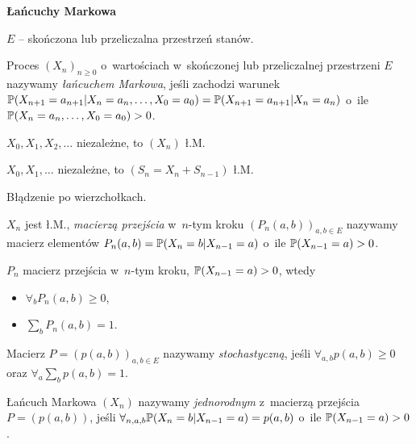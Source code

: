 	\pagebreak
	
	{\bf Łańcuchy Markowa}
	
	$E$ -- skończona lub przeliczalna przestrzeń stanów.
	
	\begin{definition}
		Proces $(X_n)_{n \geq 0}$ o~wartościach w~skończonej 
		lub przeliczalnej przestrzeni $E$ nazywamy
		\emph{łańcuchem Markowa},
		jeśli zachodzi warunek
		$\P(X_{n+1}=a_{n+1} | X_n = a_n, \ldots, X_0 = a_0)
		= \P(X_{n+1} = a_{n+1} | X_n = a_n)$
		o~ile $\P(X_n = a_n, \ldots, X_0 = a_0) > 0$.
	\end{definition}
	
	\begin{example}
		$X_0, X_1, X_2, \ldots$ niezależne, to $(X_n)$ ł.M.
	\end{example}
	
	\begin{example}
		$X_0, X_1, \ldots$ niezależne, to $(S_n = X_n + S_{n-1})$ ł.M.
	\end{example}
	
	\begin{example}
		Błądzenie po wierzchołkach.
	\end{example}
	
	\begin{definition}
		$X_n$ jest ł.M., \emph{macierzą przejścia} w~$n$-tym kroku
		$(P_n(a,b))_{a,b \in E}$ nazywamy macierz elementów
		$P_n(a,b) = \P(X_n = b | X_{n-1} = a)$ 
		o~ile $\P(X_{n-1} = a) > 0$.
	\end{definition}
	
	\begin{remark}
		$P_n$ macierz przejścia w~$n$-tym kroku, $\P(X_{n-1}=a)>0$,
		wtedy
		\begin{itemize}
			\item $\forall_b P_n(a,b) \geq 0$,
			\item $\sum_b P_n(a,b) = 1$.
		\end{itemize}

	\end{remark}
	
	\begin{definition}
		Macierz $P = (p(a,b))_{a,b \in E}$ nazywamy {\em stochastyczną},
		jeśli $\forall_{a,b} p(a,b) \geq 0 $ 
		oraz $\forall_a \sum_b p(a,b) = 1$.
	\end{definition}
	
	\begin{definition}[jednorodny ł. M.]
		Łańcuch Markowa $(X_n)$ nazywamy \emph{jednorodnym} 
		z~macierzą przejścia $P = (p(a,b))$, jeśli
		$\forall_{n,a,b} \P(X_n = b| X_{n-1} = a) = p(a,b)$
		o~ile $\P(X_{n-1} = a) > 0$.
	\end{definition}
	

